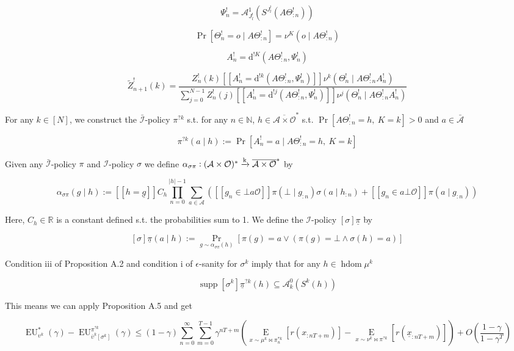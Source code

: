 \documentclass[a4paper]{article}
\DeclareMathOperator{\Supp}{supp}
\newcommand{\E}[1]{\underset{#1}{\operatorname{E}}}
\newcommand{\D}{\mathrm{d}}
\newcommand{\Nats}{\mathbb{N}}
\newcommand{\Reals}{\mathbb{R}}
\newcommand{\Abs}[1]{\left\vert #1 \right\vert}
\newcommand{\M}{\xrightarrow{\textnormal{k}}}
\newcommand{\Ob}{\mathcal{O}}
\newcommand{\A}{\mathcal{A}}
\newcommand{\In}{\mathcal{I}}
\newcommand{\FH}{(\A \times \Ob)^*}
\newcommand{\Ada}{\bar{\A}}
\newcommand{\Adi}{{\bar{\In}}}
\newcommand{\Adao}{\overline{\A \times \Ob}}
\newcommand{\Adfh}{\Adao^*}
\DeclareMathOperator{\HD}{hdom}
\newcommand{\EU}{\operatorname{EU}}
\newcommand{\Z}{Z}
\newcommand{\J}{J}
\begin{document}
$$\Psi^!_{n} = \A^1_{\J^!_l}\left(S^{\J^!_l}(A\Theta^!_{:n})\right)$$

$$\Pr\left[\Theta^!_{n} = o \mid A\Theta^!_{:n}\right] = \nu^K\left(o \mid A\Theta^!_{:n}\right)$$

$$A^!_n = \D^{!K}\left(A\Theta^!_{:n}, \Psi^!_n\right)$$

$$\tilde{\Z}^!_{n+1}(k)=\frac{\Z^!_{n}(k) [[A^!_n = \D^{!k}\left(A\Theta^!_{:n}, \Psi^!_n\right)]] \nu^k\left(\Theta^!_{n} \mid A\Theta^!_{:n}A^!_{n}\right)}{\sum_{j = 0}^{N-1} \Z^!_n(j) [[A^!_n = \D^{!j}\left(A\Theta^!_{:n}, \Psi^!_n\right)]] \nu^j(\Theta^!_n \mid A\Theta^!_{:n}A^!_n)}$$

For any $k \in [N]$, we construct the $\Adi$-policy $\pi^{?k}$ s.t. for any $n \in \Nats$, $h \in \Adfh$ s.t. $\Pr\left[A\Theta^!_{:n}=h,\ K = k\right] > 0$ and $a \in \Ada$

$$\pi^{?k}(a \mid h):=\Pr\left[A^!_n = a \mid A\Theta^!_{:n} = h,\ K = k\right]$$

Given any $\Adi$-policy $\pi$ and $\In$-policy $\sigma$ we define $\alpha_{\sigma\pi}: \FH \M \Adfh$ by

$$\alpha_{\sigma\pi} (g \mid h) := [[h = \underline{g}]]C_h\prod_{n = 0}^{\Abs{h}-1} \sum_{a \in \A}\left([[g_n \in \bot a\Ob]] \pi\left(\bot \mid g_{:n}\right)\sigma\left(a \mid h_{:n}\right)+[[g_n \in a\bot\Ob]]\pi\left(a \mid g_{:n}\right)\right)$$

Here, $C_h \in \Reals$ is a constant defined s.t. the probabilities sum to 1. We define the $\In$-policy $\left[\sigma\right]\underline{\pi}$ by

$$\left[\sigma\right]\underline{\pi}(a \mid h):=\Pr_{g \sim \alpha_{\sigma\pi}(h)}\left[\pi\left(g\right)=a \lor \left(\pi\left(g\right)=\bot \land \sigma(h)=a\right)\right]$$

Condition iii of Proposition A.2 and condition i of $\epsilon$-sanity for $\sigma^k$ imply that for any $h \in \HD{\mu^k}$

$$\Supp{\left[\sigma^k\right]\underline{\pi}^{?k}(h)} \subseteq \A^0_k\left(S^k\left(h\right)\right)$$

This means we can apply Proposition A.5 and get

$$\EU^*_{\upsilon^k}(\gamma)-\EU^{\pi^{?k}}_{\bar{\upsilon}^k[\sigma^k]}(\gamma) \leq (1-\gamma)\sum_{n=0}^\infty \sum_{m=0}^{T-1} \gamma^{nT+m}\left(\E{x\sim\mu^k\bowtie\pi^{*k}_n}\left[r\left(x_{:nT+m}\right)\right]-\E{x\sim\nu^k\bowtie\pi^{?k}}\left[r\left(\underline{x}_{:nT+m}\right)\right]\right) + O\left(\frac{1-\gamma}{1-\gamma^T}\right)$$
\end{document}
